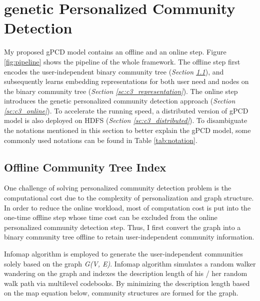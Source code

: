 \section{genetic Personalized Community Detection}

%
My proposed gPCD model contains an offline and an online step. Figure \ref{fig:pipeline} shows the pipeline of the whole framework. The offline step first encodes the user-independent binary community tree (\textit{Section \ref{sc:c3_offline}}), and subsequently learns embedding representations for both user need and nodes on the binary community tree (\textit{Section \ref{sc:c3_representation}}). The online step introduces the genetic personalized community detection approach (\textit{Section \ref{sc:c3_online}}). To accelerate the running speed, a distributed version of gPCD model is also deployed on HDFS (\textit{Section \ref{sc:c3_distributed}}).  To disambiguate the notations mentioned in this section to better explain the gPCD model, some commonly used notations can be found in Table \ref{tab:notation}. 

\subsection{Offline Community Tree Index} \label{sc:c3_offline}

One challenge of solving personalized community detection problem is the computational cost due to the complexity of personalization and graph structure. In order to reduce the online workload, most of computation cost is put into the one-time offline step whose time cost can be excluded from the online personalized community detection step. Thus, I first convert the graph into a binary community tree offline to retain user-independent community information. 

Infomap algorithm \cite{rosvall2011multilevel} is employed to generate the user-independent communities solely based on the graph \textit{G(V, E)}. Infomap algorithm simulates a random walker wandering on the graph and indexes the  description length of his / her random walk path via multilevel codebooks. By minimizing the description length based on the map equation below, community structures are formed for the graph.

